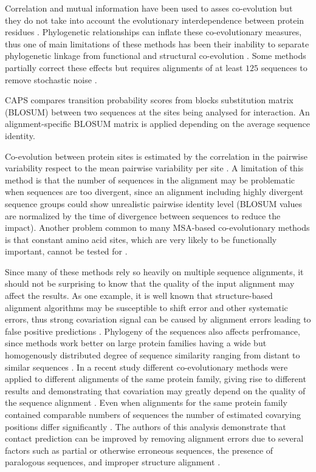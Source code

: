 Correlation and mutual information have been used to asses co-evolution but they do not take into account the evolutionary interdependence between protein residues \cite{fares2006novel}.
Phylogenetic relationships can inflate these co-evolutionary measures, thus one of main limitations of these methods has been their inability to separate phylogenetic linkage from functional and structural co-evolution \cite{fares2006novel}.
Some methods partially correct these effects but requires alignments of at least $125$ sequences to remove stochastic noise \cite{fares2006novel:REF Gloor et al. (2005)}.

CAPS \cite{fares2006novel} compares transition probability scores from blocks substitution matrix (BLOSUM) between two sequences at the sites being analysed for interaction.
An alignment-specific BLOSUM matrix is applied depending on the average sequence identity.

Co-evolution between protein sites is estimated by the correlation in the pairwise variability respect to the mean pairwise variability per site \cite{fares2006novel}.
A limitation of this method is that the number of sequences in the alignment may be problematic when sequences are too divergent, since an alignment including highly divergent sequence groups could show unrealistic pairwise identity level (BLOSUM values are normalized by the time of divergence between sequences to reduce the impact).
Another problem common to many MSA-based co-evolutionary methods is that constant amino acid sites, which are very likely to be functionally important, cannot be tested for  \cite{fares2006novel}.

Since many of these methods rely so heavily on multiple sequence alignments, it should not be surprising to know that the quality of the input alignment may affect the results.
As one example, it is well known that structure-based alignment algorithms may be susceptible to shift error and other systematic errors, thus strong covariation signal can be caused by alignment errors leading to false positive predictions \cite{dickson2010identifying}.
Phylogeny of the sequences also affects perfromance, since methods work better on large protein families having a wide but homogenously distributed degree of sequence similarity ranging from distant to similar sequences \cite{de2013emerging}.
In a recent study different co-evolutionary methods were applied to different alignments of the same protein family, giving rise to different results and demonstrating that covariation may greatly depend on the quality of the sequence alignment \cite{dickson2010identifying}.
Even when alignments for the same protein family contained comparable numbers of sequences the number of estimated covarying positions differ significantly \cite{dickson2010identifying}.
The authors of this analysis demonstrate that contact prediction can be improved by removing alignment errors due to several factors such as partial or otherwise erroneous sequences, the presence of paralogous sequences, and improper structure alignment \cite{dickson2010identifying}.

